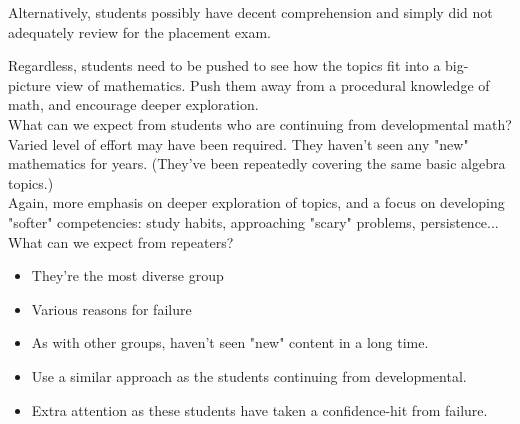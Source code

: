 \documentclass{ximera}
\begin{document}
\begin{corollary}
Alternatively, students possibly have decent comprehension and simply did not 
adequately review for the placement exam. \\
\end{corollary}

Regardless, students need to be pushed to see how the topics fit into a big-
picture view of mathematics. Push them away from a procedural knowledge of
math, and encourage deeper exploration.\\


What can we expect from students who are continuing from developmental math? \\

Varied level of effort may have been required. They haven't seen any "new" 
mathematics for years. (They've been repeatedly covering the same basic algebra
topics.)\\

Again, more emphasis on deeper exploration of topics, and a focus on developing
"softer" competencies: study habits, approaching "scary" problems, persistence...\\


What can we expect from repeaters?\\
\begin{itemize}
\item They're the most diverse group
\item Various reasons for failure
\item As with other groups, haven't seen "new" content in a long time.
\item Use a similar approach as the students continuing from developmental.
\item Extra attention as these students have taken a confidence-hit from failure.
\end{itemize}
\end{document}
